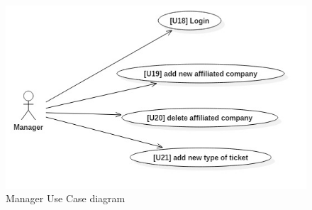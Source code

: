 	\begin{figure}[H]	
	\centerline{\includegraphics[scale= 0.7]{Images/UseCaseDiagram3}}
	\caption{Manager Use Case diagram}
\end{figure}


		\renewcommand{\arraystretch}{1.6} %
		
